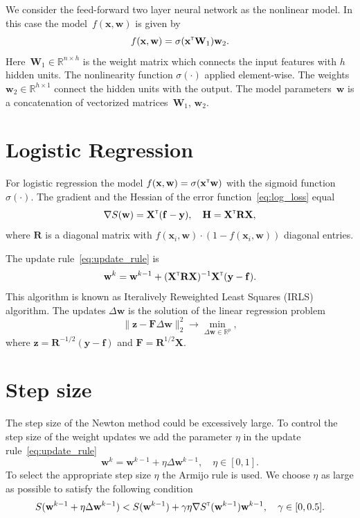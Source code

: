 \documentclass[a4paper,12pt]{article}
\theoremstyle{plain} %
\theoremstyle{definition} %
\theoremstyle{remark} %
\newcommand{\bw}{\mathbf{w}}
\newcommand{\by}{\mathbf{y}}
\newcommand{\bx}{\mathbf{x}}
\newcommand{\bz}{\mathbf{z}}
\newcommand{\bbR}{\mathbb{R}}
\newcommand{\bW}{\mathbf{W}}
\newcommand{\bH}{\mathbf{H}}
\newcommand{\bF}{\mathbf{F}}
\newcommand{\bR}{\mathbf{R}}
\newcommand{\bX}{\mathbf{X}}
\newcommand{\T}{{\text{\tiny\sffamily\upshape\mdseries T}}}
\begin{document}
	We consider the feed-forward two layer neural network as the nonlinear model. In this case the model~$f(\bx, \bw)$ is given by
	\[
	f(\bx, \bw) = \sigma(\bx^{\T} \bW_1) \bw_2.
	\]
	Here~$\bW_1 \in \bbR^{n \times h}$ is the weight matrix which connects the input features with $h$ hidden units. The nonlinearity function $\sigma(\cdot)$ applied element-wise. The weights $\bw_2 \in \bbR^{h \times 1}$ connect the hidden units with the output. 
	The model parameters~$\bw$ is a concatenation of vectorized matrices~$\bW_1$, $\bw_2$.
	
	\section*{Logistic Regression}
	For logistic regression the model $f(\bx , \bw) = \sigma(\bx^{\T} \bw)$ with the sigmoid function~$\sigma(\cdot)$.
	The gradient and the Hessian of the error function~\eqref{eq:log_loss} equal
	\begin{equation}
		\nabla S(\bw) = \bX^{\T} (\mathbf{f} - \by), \quad \bH = \bX^{\T} \bR \bX,
		\label{eq:log_reg_deriv}
	\end{equation}
	where $\bR$ is a diagonal matrix with $f(\bx_i , \bw) \cdot (1 - f(\bx_i , \bw))$ diagonal entries.
	
	The update rule~\eqref{eq:update_rule} is
	\[
		\bw^k = \bw^{k - 1} + (\bX^{\T} \bR \bX)^{-1} \bX^{\T} (\by - \mathbf{f}).
	\]
	This algorithm is known as Iteralively Reweighted Least Squares (IRLS) algorithm. The updates $\Delta \bw$ is the solution of the linear regression problem
	\begin{equation}
		\| \bz - \bF \Delta \bw \|_2^2 \rightarrow \min_{\Delta \bw \in \bbR^{p}},
		\label{eq:lin_reg_log_reg}
	\end{equation}
	where $\bz = \bR^{-1/2} (\by - \mathbf{f})$ and $\bF = \bR^{1/2}\bX$.
	
	\section*{Step size}
	
	The step size of the Newton method could be excessively large. To control the step size of the weight updates we add the parameter $\eta$ in the update rule~\eqref{eq:update_rule}
	\[
		\bw^k = \bw^{k - 1} + \eta \Delta \bw^{k - 1}, \quad \eta \in [0, 1].
	\]
	To select the appropriate step size $\eta$ the Armijo rule is used. We choose $\eta$ as large as possible to satisfy the following condition
	\[
		S(\bw^{k - 1} + \eta \Delta \bw^{k - 1}) < S(\bw^{k - 1}) + \gamma \eta \nabla S^{\T}(\bw^{k-1})\bw^{k - 1}, \quad \gamma \in [0, 0.5].
	\]
	
\end{document}
